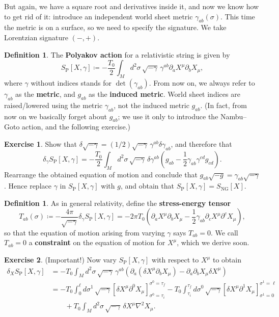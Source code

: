 \documentclass{report}
\theoremstyle{plain}
\theoremstyle{definition}
\newtheorem{definition}[theorem]{Definition}
\newtheorem{exercise}{Exercise}[section]
\theoremstyle{remark}
\newcommand{\di}{\partial}
\begin{document}
But again, we have a square root and derivatives inside it, and now we
know how to get rid of it: introduce an independent world sheet metric
$\gamma_{ab}(\sigma)$. This time the metric is on a surface, so
we need to specify the signature. We take Lorentzian signature $(-,
+)$.

\begin{definition}
  The {\bf Polyakov action} for a relativistic string is given by
  \[ S_{\text{P}}[X, \gamma] \coloneqq -\frac{T_0}{2} \int_M d^2\sigma \, \sqrt{-\gamma} \, \gamma^{ab} \di_a X^\mu \di_b X_\mu, \]
  where $\gamma$ without indices stands for $\det(\gamma_{ab})$. From
  now on, we always refer to $\gamma_{ab}$ as the {\bf metric}, and
  $g_{ab}$ as the {\bf induced metric}. World sheet indices are
  raised/lowered using the metric $\gamma_{ab}$, not the induced
  metric $g_{ab}$. (In fact, from now on we basically forget about
  $g_{ab}$; we use it only to introduce the Nambu--Goto action, and
  the following exercise.)
\end{definition}

\begin{exercise}
  Show that $\delta \sqrt{-\gamma} = (1/2)\sqrt{-\gamma} \,
  \gamma^{ab} \delta \gamma_{ab}$, and therefore that
  \[ \delta_\gamma S_{\text{P}}[X, \gamma] = -\frac{T_0}{2} \int_M d^2\sigma \, \sqrt{-\gamma} \, \delta \gamma^{ab} \left(g_{ab} - \frac{1}{2} \gamma_{ab} \gamma^{cd} g_{cd}\right). \]
  Rearrange the obtained equation of motion and conclude that
  $g_{ab}\sqrt{-g} = \gamma_{ab}\sqrt{-\gamma}$. Hence replace
  $\gamma$ in $S_{\text{P}}[X, \gamma]$ with $g$, and obtain that
  $S_{\text{P}}[X, \gamma] = S_{\text{NG}}[X]$.
\end{exercise}

\begin{definition}
  As in general relativity, define the {\bf stress-energy tensor}
  \[ T_{ab}(\sigma) \coloneqq -\frac{4\pi}{\sqrt{-\gamma}} \delta_{\gamma} S_{\text{P}}[X, \gamma] = -2\pi T_0 \left(\di_a X^\mu \di_b X_\mu - \frac{1}{2} \gamma_{ab} \di_c X^\mu \di^c X_\mu\right), \]
  so that the equation of motion arising from varying $\gamma$ says
  $T_{ab} = 0$. We call $T_{ab} = 0$ a {\bf constraint} on the
  equation of motion for $X^\mu$, which we derive soon.
\end{definition}

\begin{exercise} (Important!)
  Now vary $S_{\text{P}}[X, \gamma]$ with respect to $X^\mu$ to obtain
  \begin{align*}
    \delta_X S_{\text{P}}[X, \gamma]
    &= -T_0 \int_M d^2\sigma \, \sqrt{-\gamma} \, \gamma^{ab} \left(\di_a(\delta X^\mu \di_b X_\mu) - \di_a \di_b X_\mu \delta X^\mu\right) \\
    &= -T_0 \int_0^{\ell} d\sigma^1 \, \sqrt{-\gamma} \left[\delta X^\mu \di^0 X_\mu\right]_{\sigma^0=\tau_i}^{\sigma^0=\tau_f} - T_0 \int_{\tau_i}^{\tau_f} d\sigma^0 \, \sqrt{-\gamma} \left[\delta X^\mu \di^1 X_\mu\right]_{\sigma^1=0}^{\sigma^1=\ell} \\
    &\qquad + T_0 \int_M d^2\sigma \, \sqrt{-\gamma} \, \delta X^\mu \nabla^2 X_\mu.
  \end{align*}
\end{exercise}
\end{document}
